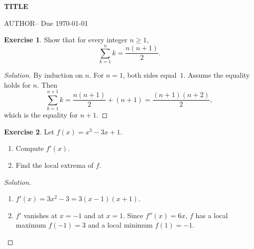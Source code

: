 \documentclass[11pt]{article}
\newcommand{\student}{{{AUTHOR}}}
\theoremstyle{definition}
\newtheorem{exercise}{Exercise}
\newenvironment{solution}{\begin{proof}[Solution]}{\end{proof}}
\begin{document}
\begin{center}
  {\LARGE\bfseries {{TITLE}} \par}
  \medskip
  \student \quad -- \quad Due \today
\end{center}

\begin{exercise}
Show that for every integer $n \ge 1$,
\[
  \sum_{k=1}^{n} k = \frac{n(n+1)}{2}.
\]
\end{exercise}

\begin{solution}
By induction on $n$. For $n = 1$, both sides equal~$1$. Assume the equality
holds for $n$. Then
\[
  \sum_{k=1}^{n+1} k = \frac{n(n+1)}{2} + (n+1) = \frac{(n+1)(n+2)}{2},
\]
which is the equality for $n+1$.
\end{solution}

\begin{exercise}
Let $f(x) = x^3 - 3x + 1$.
\begin{enumerate}[label=(\alph*)]
  \item Compute $f'(x)$.
  \item Find the local extrema of $f$.
\end{enumerate}
\end{exercise}

\begin{solution}
\begin{enumerate}[label=(\alph*)]
  \item $f'(x) = 3x^2 - 3 = 3(x - 1)(x + 1)$.
  \item $f'$ vanishes at $x = -1$ and at $x = 1$. Since $f''(x) = 6x$, $f$
        has a local maximum $f(-1) = 3$ and a local minimum $f(1) = -1$.
\end{enumerate}
\end{solution}
\end{document}
